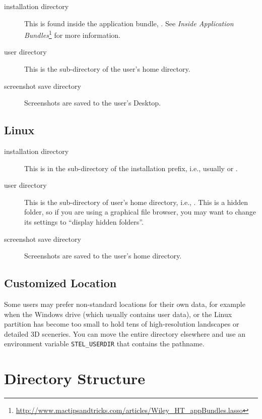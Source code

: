 \begin{description}
\item[installation directory] This is found inside the application
  bundle, . See \emph{Inside Application
    Bundles}\footnote{\url{http://www.mactipsandtricks.com/articles/Wiley_HT_appBundles.lasso}}
  for more information.
\item[user directory] This is the sub-directory 
   of the user's home
  directory.
\item[screenshot save directory] Screenshots are saved to the user's
  Desktop.
\end{description}

\subsection{Linux}
\label{sec:FilesAndDirectories:Linux}

\begin{description}
\item[installation directory] This is in the
   sub-directory of the installation prefix,
  i.e., usually  or
  .
\item[user directory] This is the  sub-directory of
  user's home directory, i.e.,
  . This is a hidden folder, so
  if you are using a graphical file browser, you may want to change
  its settings to ``display hidden folders''.
\item[screenshot save directory] Screenshots are saved to the user's
  home directory.
\end{description}

\subsection{Customized Location}
\label{sec:FilesAndDirectories:Custom}

Some users may prefer non-standard locations for
their own data, for example when the Windows  drive (which
usually contains user data), or the Linux  partition has
become too small to hold tens of high-resolution landscapes or
detailed 3D sceneries. You can move the entire directory elsewhere and
use an environment variable \texttt{STEL\_USERDIR} that contains the
pathname.

\section{Directory Structure}
\label{sec:FilesAndDirectories:DirectoryStructure}

